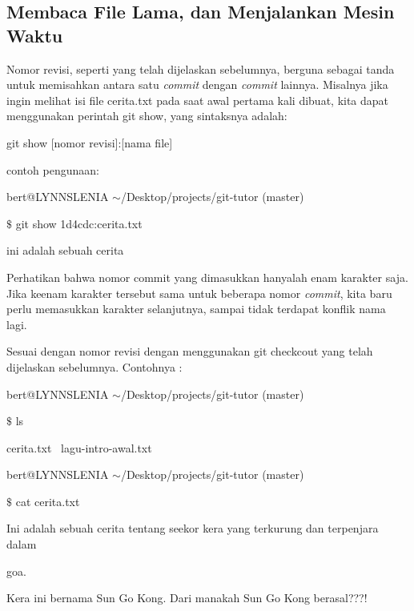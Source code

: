 \subsection{Membaca File Lama, dan Menjalankan Mesin Waktu}
\hspace*{0.50in} Nomor revisi, seperti yang telah dijelaskan sebelumnya, berguna sebagai tanda untuk memisahkan antara satu \emph{commit} dengan \emph{commit} lainnya. Misalnya jika  ingin melihat isi file cerita.txt pada saat awal pertama kali dibuat, kita dapat menggunakan perintah git show, yang sintaksnya adalah: \par
git show [nomor revisi]:[nama file] \par
\vspace{12pt}
\noindent 
contoh pengunaan: \par
bert@LYNNSLENIA  $  \sim  $/Desktop/projects/git-tutor (master) \par
 $  \$  $ git show 1d4cdc:cerita.txt \par
ini adalah sebuah cerita \par
\vspace{12pt}
\hspace*{0.50in} Perhatikan bahwa nomor commit yang dimasukkan hanyalah enam karakter saja. Jika keenam karakter tersebut sama untuk beberapa nomor \textit{commit}, kita baru perlu memasukkan karakter selanjutnya, sampai tidak terdapat konflik nama lagi. \par
\hspace*{0.50in} Sesuai dengan nomor revisi dengan menggunakan {\fontsize{10pt}{10pt}\selectfont git checkcout yang telah dijelaskan sebelumnya. Contohnya :} \par
bert@LYNNSLENIA  $  \sim  $/Desktop/projects/git-tutor (master) \par
 $  \$  $ ls \par
cerita.txt~ lagu-intro-awal.txt \par
\vspace{12pt}
bert@LYNNSLENIA  $  \sim  $/Desktop/projects/git-tutor (master) \par
 $  \$  $ cat cerita.txt \par
Ini adalah sebuah cerita tentang seekor kera yang terkurung dan terpenjara dalam \par
 goa. \par
\vspace{12pt}
Kera ini bernama Sun Go Kong. Dari manakah Sun Go Kong berasal???! \par
\vspace{12pt}
